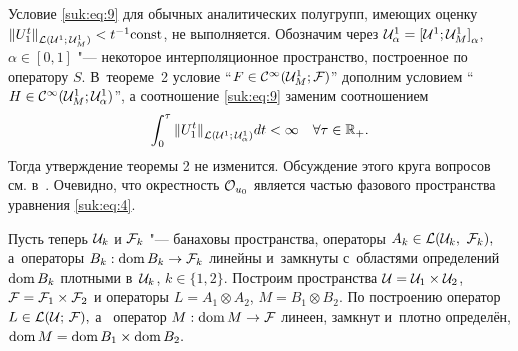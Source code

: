 

\begin{remark}[1]   Условие   \eqref{suk:eq:9}  для обычных аналитических полугрупп,  имеющих  оценку ${\| U^t_1 \|}_{{\cal L}({\cal U}^1;\,{\cal U}_M^1)}<t^{-1}{\rm const} $, не выполняется. 
Обозначим через ${\cal U}_{\alpha}^1={[{\cal U}^1; {\cal U}_M^1]}_{\alpha}$, $\alpha\in [0, 1]$  "---     некоторое    интерполяционное пространство,
построенное  по  оператору  $S.$ 
В~теореме~2 условие   ``$F \in {\cal C}^ \infty({\cal U}_M^1;{\cal F})$'' дополним условием  ``$H \in {\cal C}^ \infty({\cal U}_M^1;{\cal U}_{\alpha}^1)$'', а соотношение \eqref{suk:eq:9} заменим соотношением 
\begin{equation}
\int_0^{\tau} {\| U_1^t \|}_{{\cal L}({\cal U}^1;\,{\cal U}_{\alpha}^1)} dt< \infty \quad \forall \tau \in {\mathbb R}_{+}. 
\label{suk:eq:10}
\end{equation}
Тогда утверждение теоремы 2 не изменится. 
Обсуждение этого  круга вопросов см. в~\cite[гл. 9]{suk:cite:10}. Очевидно, что окрестность ${\cal O}_{u_0}$
 является частью фазового пространства уравнения \eqref{suk:eq:4}.
\end{remark}


Пусть теперь ${\cal U}_k $  и ${\cal F}_k $  "---   банаховы пространства, операторы $A_k \in {\cal L}({\cal U}_k,$ ${\cal F}_k),$
а~операторы $B_k: {\rm dom}\,B_k \to {\cal F}_k$ линейны и~замкнуты с~областями определений ${\rm dom}\,B_k$ плотными в~${\cal U}_k$, $k\in \{1, 2\}.$
Построим  пространства  ${\cal U}={\cal U}_1 \times {\cal U}_2$, ${\cal F}={\cal F}_1 \times {\cal F}_2 $ и операторы $L=A_1 \otimes A_2$, $M=B_1 \otimes B_2.$ 
По построению оператор  $L \in {\cal L(U;\,F)},$  а~ оператор $M: {\rm dom}\, M \to {\cal F}$  линеен, замкнут и~плотно определён, 
${\rm dom}\, M={\rm dom}\, B_1 \times {\rm dom}\, B_2.$


